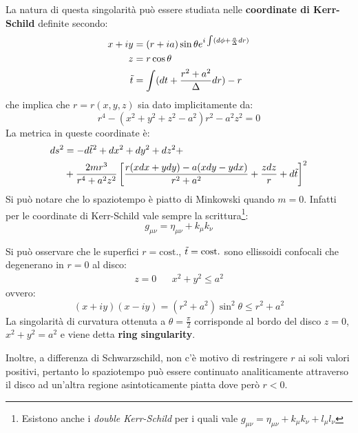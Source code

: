La natura di questa singolarità può essere studiata nelle \textbf{coordinate di Kerr-Schild} definite secondo:
\begin{align*}
    x + iy &= (r + ia)\sin\theta e^{i \int ( d\phi + \frac{a}{\Delta}dr)} \\
    z &= r\cos\theta \\
    \Tilde{t} &= \int ( dt + \frac{r^2 + a^2}{\Delta}dr) -r
\end{align*}
che implica che  $r = r(x,y,z)$ sia dato implicitamente da:
\begin{equation*}
    r^4 - (x^2 + y^2 + z^2 - a^2)r^2 - a^2z^2 = 0
\end{equation*}
La metrica in queste coordinate è:
\begin{align}
    ds^2 &= - d\Tilde{t}^2 + dx^2 + dy^2 + dz^2 + \nonumber \\
 &+\frac{2mr^3}{r^4+a^2z^2}\left[ \frac{r(xdx + ydy) - a(xdy -ydx)}{r^2 + a^2} + \frac{zdz}{r} + d\Tilde{t}\right]^2
\label{eq.metrica_kerr_schild}
\end{align}
Si può notare che lo spaziotempo è piatto di Minkowski quando $m=0$.  Infatti per le coordinate di Kerr-Schild vale sempre la scrittura\footnote{Esistono anche i \textit{double Kerr-Schild} per i quali vale $g_{\mu\nu} = \eta_{\mu\nu} + k_\mu k_\nu + l_\mu l_\nu$}:
\begin{equation}
    g_{\mu\nu} = \eta_{\mu\nu} + k_\mu k_\nu
\end{equation}

Si può osservare che le superfici $r=\textrm{cost.}$, $\Tilde{t}= \textrm{cost.}$ sono ellissoidi confocali che degenerano in $r= 0$ al disco:
\begin{align*}
    z = 0 && x^2 + y^2 \leq a^2
\end{align*}
ovvero:
\begin{equation*}
    (x+iy)(x-iy) = (r^2 + a^2)\sin^2\theta \leq r^2 + a^2
\end{equation*}
La singolarità di curvatura ottenuta a $\theta = \frac{\pi}{2}$ corrisponde al bordo del disco $z = 0$, $x^2 +y^2 = a^2$ e viene detta \textbf{ring singularity}.

Inoltre, a differenza di Schwarzschild, non c'è motivo di restringere $r$ ai soli valori positivi, pertanto lo spaziotempo può essere continuato analiticamente attraverso il disco ad un'altra regione asintoticamente piatta dove però $r < 0$.

